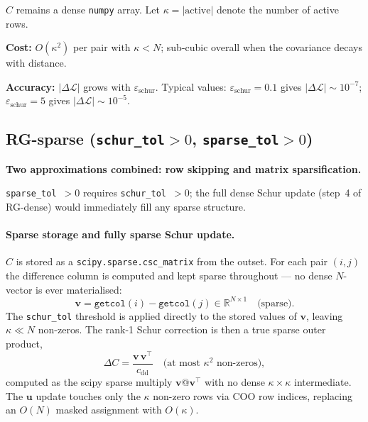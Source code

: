 \documentclass[11pt]{article}
\begin{document}
$C$ remains a dense \texttt{numpy} array.
Let $\kappa = |\mathrm{active}|$ denote the number of active rows.

\noindent\textbf{Cost:} $O(\kappa^2)$ per pair with $\kappa < N$;
sub-cubic overall when the covariance decays with distance.

\noindent\textbf{Accuracy:} $|\Delta\mathcal{L}|$ grows with
$\varepsilon_\mathrm{schur}$.
Typical values: $\varepsilon_\mathrm{schur}=0.1$ gives
$|\Delta\mathcal{L}|\sim 10^{-7}$;
$\varepsilon_\mathrm{schur}=5$ gives $|\Delta\mathcal{L}|\sim 10^{-5}$.

\subsection{RG-sparse (\texttt{schur\_tol}$>0$, \texttt{sparse\_tol}$>0$)}

\textbf{Two approximations combined: row skipping and matrix sparsification.}

\texttt{sparse\_tol}~$>0$ requires \texttt{schur\_tol}~$>0$;
the full dense Schur update (step~4 of RG-dense) would immediately fill
any sparse structure.

\paragraph{Sparse storage and fully sparse Schur update.}
$C$ is stored as a \texttt{scipy.sparse.csc\_matrix} from the outset.
For each pair $(i,j)$ the difference column is computed and kept sparse
throughout — no dense $N$-vector is ever materialised:
\begin{equation}
  \mathbf{v} = \texttt{getcol}(i) - \texttt{getcol}(j)
  \in \mathbb{R}^{N\times 1} \quad\text{(sparse)}.
\end{equation}
The \texttt{schur\_tol} threshold is applied directly to the stored values
of $\mathbf{v}$, leaving $\kappa \ll N$ non-zeros.
The rank-1 Schur correction is then a true sparse outer product,
\begin{equation}
  \Delta C = \frac{\mathbf{v}\,\mathbf{v}^\top}{c_\mathrm{dd}}
  \quad\text{(at most $\kappa^2$ non-zeros)},
\end{equation}
computed as the scipy sparse multiply $\mathbf{v} @ \mathbf{v}^\top$ with
no dense $\kappa\times\kappa$ intermediate.
The $\mathbf{u}$ update touches only the $\kappa$ non-zero rows via COO
row indices, replacing an $O(N)$ masked assignment with $O(\kappa)$.
\end{document}
